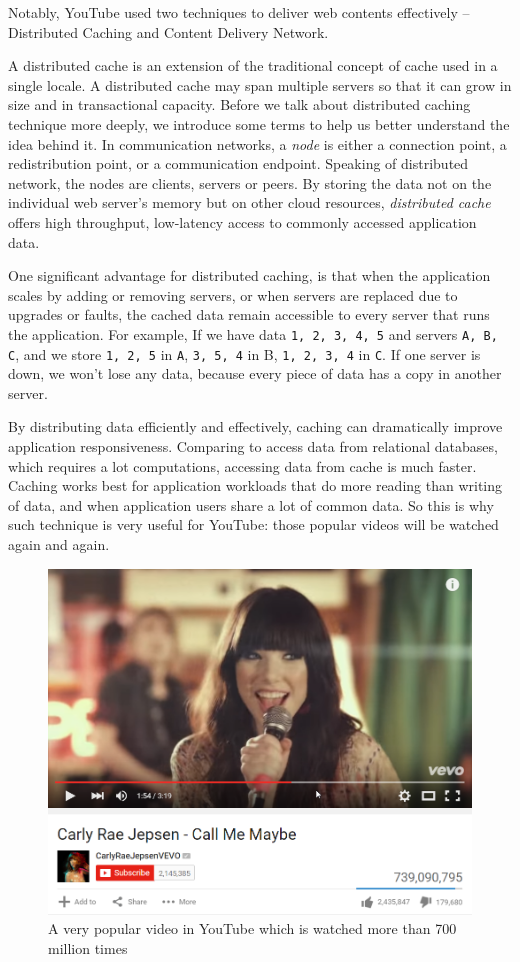 Notably, YouTube used two techniques to deliver web contents effectively -- Distributed Caching and Content Delivery Network.

A distributed cache is an extension of the traditional concept of cache used in a single locale. A distributed cache may span multiple servers so that it can grow in size and in transactional capacity\cite{wiki:dcache}. Before we talk about distributed caching technique more deeply, we introduce some terms to help us better understand the idea behind it. In communication networks, a \textit{node} is either a connection point, a redistribution point, or a communication endpoint. Speaking of distributed network, the nodes are clients, servers or peers. By storing the data not on the individual web server's memory but on other cloud resources, \textit{distributed cache} offers high throughput, low-latency access to commonly accessed application data.

One significant advantage for distributed caching, is that when the application scales by adding or removing servers, or when servers are replaced due to upgrades or faults, the cached data remain accessible to every server that runs the application. For example, If we have data \texttt{1, 2, 3, 4, 5} and servers \texttt{A, B, C}, and we store \texttt{1, 2, 5} in \texttt{A}, \texttt{3, 5, 4} in B, \texttt{1, 2, 3, 4} in \texttt{C}. If one server is down, we won't lose any data, because every piece of data has a copy in another server.


By distributing data efficiently and effectively, caching can dramatically improve application responsiveness. Comparing to access data from relational databases, which requires a lot computations, accessing data from cache is much faster. Caching works best for application workloads that do more reading than writing of data, and when application users share a lot of common data. So this is why such technique is very useful for YouTube: those popular videos will be watched again and again.

\begin{figure}[H]
	\centering
	\includegraphics[width=0.7\linewidth]{CallMeMaybe.png}
	\caption{A very popular video in YouTube which is watched more than 700 million times}
\end{figure}

